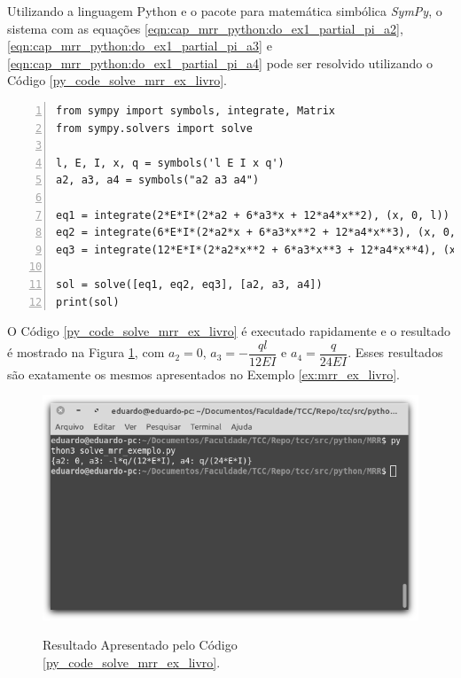 \documentclass[
	12pt,				%
	openright,			%
    twoside,			%
	a4paper,			%
	english,			%
	french,				%
	spanish,			%
	brazil				%
	]{abntex2}
\numberwithin{lema}{chapter}
\numberwithin{teorema}{chapter}
\numberwithin{definicao}{chapter}
\numberwithin{exemplo}{chapter}
\numberwithin{figure}{chapter}
\begin{document}
Utilizando a linguagem Python e o pacote para matemática simbólica \textit{SymPy}, o sistema com as equações \eqref{eqn:cap_mrr_python:do_ex1_partial_pi_a2}, \eqref{eqn:cap_mrr_python:do_ex1_partial_pi_a3} e \eqref{eqn:cap_mrr_python:do_ex1_partial_pi_a4} pode ser resolvido utilizando o Código \ref{py_code_solve_mrr_ex_livro}.

\begin{lstlisting}[style=Python, xleftmargin=2em, numbers=left, caption={Código para a resolução do Exemplo \ref{ex:mrr_ex_livro}}, captionpos=t, label=py_code_solve_mrr_ex_livro]
from sympy import symbols, integrate, Matrix
from sympy.solvers import solve

l, E, I, x, q = symbols('l E I x q')
a2, a3, a4 = symbols("a2 a3 a4")

eq1 = integrate(2*E*I*(2*a2 + 6*a3*x + 12*a4*x**2), (x, 0, l)) - integrate(q*x**2 - q*l*x, (x, 0, l))
eq2 = integrate(6*E*I*(2*a2*x + 6*a3*x**2 + 12*a4*x**3), (x, 0, l)) - integrate(q*x**3 - q*(l**2)*x, (x, 0, l))
eq3 = integrate(12*E*I*(2*a2*x**2 + 6*a3*x**3 + 12*a4*x**4), (x, 0, l)) - integrate(q*x**4 - q*(l**3)*x, (x, 0, l))

sol = solve([eq1, eq2, eq3], [a2, a3, a4])
print(sol)
\end{lstlisting}

O Código \ref{py_code_solve_mrr_ex_livro} é executado rapidamente e o resultado é mostrado na Figura \ref{fig:code_solve_mrr_exemplo_livro}, com $a_2=0$, $a_3=-\dfrac{ql}{12EI}$ e $a_4=\dfrac{q}{24EI}$. Esses resultados são exatamente os mesmos apresentados no Exemplo \ref{ex:mrr_ex_livro}.

\begin{figure}[h]
	\caption{Resultado Apresentado pelo Código \ref{py_code_solve_mrr_ex_livro}.}
	\centering
	\includegraphics[scale=2.5]{../figuras/code/code_solve_mrr_exemplo_livro.png}
	\label{fig:code_solve_mrr_exemplo_livro}
\end{figure}
\end{document}
